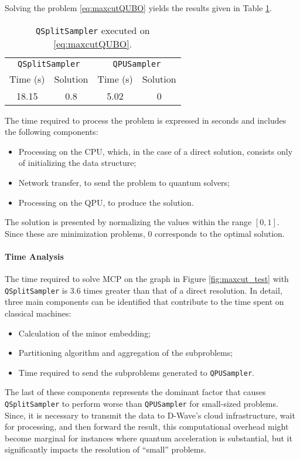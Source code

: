 Solving the problem \eqref{eq:maxcutQUBO} yields the results given in Table \ref{tab:maxcut}.

\begin{table}[H]
    \centering
    \begin{tabular}{cccc}
        \toprule
        \multicolumn{2}{c}{\texttt{QSplitSampler}} & \multicolumn{2}{c}{\texttt{QPUSampler}} \\
        Time (s) & Solution & Time (s) & Solution \\
        \midrule
        18.15 & 0.8 & 5.02 & 0        
    \end{tabular}
    \caption{\texttt{QSplitSampler} executed on \eqref{eq:maxcutQUBO}.}
    \label{tab:maxcut}
\end{table}

The time required to process the problem is expressed in seconds and includes the following components: 
\begin{itemize} 
    \item Processing on the CPU, which, in the case of a direct solution, consists only of initializing the data structure; 
    \item Network transfer, to send the problem to quantum solvers;
    \item Processing on the QPU, to produce the solution. 
\end{itemize}

The solution is presented by normalizing the values within the range $[0, 1]$. 
Since these are minimization problems, $0$ corresponds to the optimal solution.

\paragraph{Time Analysis} The time required to solve MCP on the graph in Figure \ref{fig:maxcut_test} with \texttt{QSplitSampler} is 3.6 times greater than that of a direct resolution. 
In detail, three main components can be identified that contribute to the time spent on classical machines:
\begin{itemize}
    \item Calculation of the minor embedding;
    \item Partitioning algorithm and aggregation of the subproblems;
    \item Time required to send the subproblems generated to \texttt{QPUSampler}.
\end{itemize}
The last of these components represents the dominant factor that causes \texttt{QSplitSampler} to perform worse than \texttt{QPUSampler} for small-sized problems.
Since, it is necessary to transmit the data to D-Wave's cloud infrastructure, wait for processing, and then forward the result, this computational overhead might become marginal for instances where quantum acceleration is substantial, but it significantly impacts the resolution of ``small'' problems.

